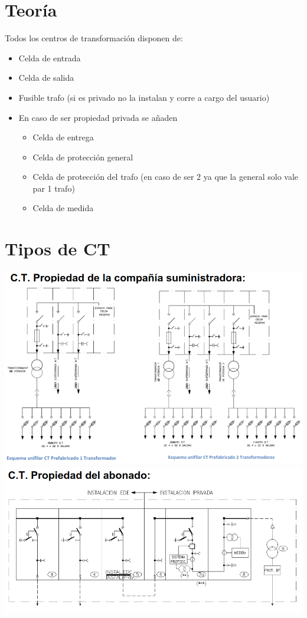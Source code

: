 \documentclass[10pt,a4paper]{article}
\begin{document}
\section{Teoría}
Todos los centros de transformación disponen de:
\begin{itemize}
    \item Celda de entrada
    \item Celda de salida
    \item Fusible trafo (si es privado no la instalan y corre a cargo del usuario)
    
    \item En caso de ser propiedad privada se añaden
    \begin{itemize}
        \item Celda de entrega
        \item Celda de protección general
        \item Celda de protección del trafo (en caso de ser 2 ya que la general solo vale par 1 trafo)
        \item Celda de medida
    \end{itemize}
\end{itemize}
\section{Tipos de CT}
\begin{center}
    \includegraphics[scale = 0.6]{1.png}
    \includegraphics[scale = 0.6]{2.png}
\end{center}
\end{document}
